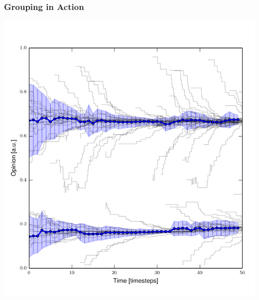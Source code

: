 \documentclass[10pt]{beamer}
\begin{document}
\begin{frame}\frametitle{Grouping in Action}
    \begin{center}
        \includegraphics[height=0.8\textheight]{src/evol_03_groups.pdf}
    \end{center}
    

\end{frame}
\end{document}
